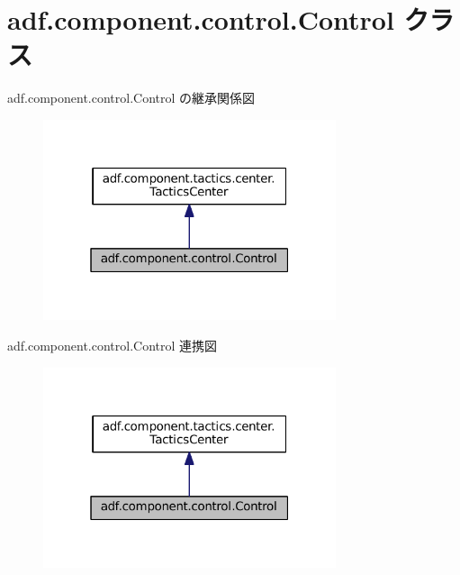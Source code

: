 \hypertarget{classadf_1_1component_1_1control_1_1Control}{}\section{adf.\+component.\+control.\+Control クラス}
\label{classadf_1_1component_1_1control_1_1Control}


adf.\+component.\+control.\+Control の継承関係図
\nopagebreak
\begin{figure}[H]
\begin{center}
\leavevmode
\includegraphics[width=244pt]{classadf_1_1component_1_1control_1_1Control__inherit__graph}
\end{center}
\end{figure}


adf.\+component.\+control.\+Control 連携図
\nopagebreak
\begin{figure}[H]
\begin{center}
\leavevmode
\includegraphics[width=244pt]{classadf_1_1component_1_1control_1_1Control__coll__graph}
\end{center}
\end{figure}
